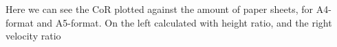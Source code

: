 \documentclass[preview]{standalone}
\begin{document}
\begin{center}
Here we can see the CoR plotted against the amount of paper sheets, for A4-format and A5-format. On the left calculated with height ratio, and the right velocity ratio
\end{center}
\end{document}
